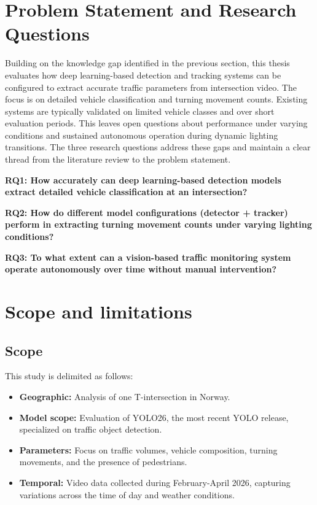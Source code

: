 \section{Problem Statement and Research Questions}
\label{sec:rq}

Building on the knowledge gap identified in the previous section, this thesis evaluates how deep learning-based detection and tracking systems can be configured to extract accurate traffic parameters from intersection video. The focus is on detailed vehicle classification and turning movement counts. Existing systems are typically validated on limited vehicle classes and over short evaluation periods. This leaves open questions about performance under varying conditions and sustained autonomous operation during dynamic lighting transitions. The three research questions address these gaps and maintain a clear thread from the literature review to the problem statement.

  
    \textbf{RQ1: How accurately can deep learning-based detection models extract detailed vehicle classification at an intersection?} 
    
    \textbf{RQ2: How do different model configurations (detector + tracker) perform in extracting turning movement counts under varying lighting conditions?}
    
    \textbf{RQ3: To what extent can a vision-based traffic monitoring system operate autonomously over time without manual intervention?}




\section{Scope and limitations}

\subsection*{Scope}
This study is delimited as follows:
\begin{itemize}
    \item \textbf{Geographic:} Analysis of one T-intersection in Norway.

    \item \textbf{Model scope:} Evaluation of YOLO26, the most recent YOLO release, specialized on traffic object detection.

    \item \textbf{Parameters:} Focus on traffic volumes, vehicle composition, turning movements, and the presence of pedestrians.
    
   \item \textbf{Temporal:} Video data collected during February-April 2026, capturing variations across the time of day and weather conditions.
    
\end{itemize}

